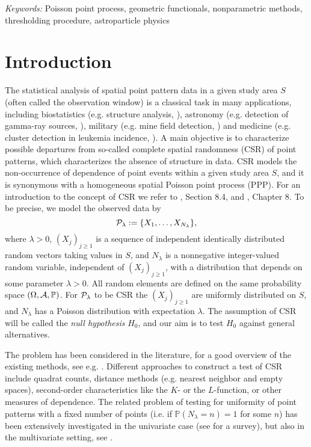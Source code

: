\documentclass[12pt]{article}
\def\P{\mathbb{P}}
\begin{document}
\noindent%
{\it Keywords:} Poisson point process, geometric functionals, nonparametric methods, thresholding procedure, astroparticle physics
\vfill

\newpage
{} %
\section{Introduction}
The statistical analysis of spatial point pattern data in a given study area $S$ (often called the observation window) is a classical task in many applications, including biostatistics
(e.g. structure analysis, \cite{25}), astronomy (e.g. detection of gamma-ray sources, \cite{24}), military (e.g. mine field detection, \cite{22}) and medicine (e.g. cluster detection in leukemia incidence, \cite{23}). A main objective is to characterize possible departures from so-called complete spatial randomness (CSR) of point patterns, which characterizes the absence of structure in data. CSR models the non-occurrence of dependence of point events within a given study area $S$, and it is synonymous with a homogeneous spatial Poisson point process (PPP). For an introduction to the concept of CSR we refer to \cite{15}, Section 8.4, and \cite{17}, Chapter 8. To be precise, we model the observed data by
\begin{equation*}
{\cal P}_\lambda := \{X_1,\ldots,X_{N_\lambda}\},
\end{equation*}
where $\lambda>0$, $(X_j)_{j\ge1}$ is a sequence of independent identically distributed random vectors taking values in $S$, and $N_\lambda$ is a nonnegative integer-valued random variable, independent of $(X_j)_{j \ge 1}$, with a distribution  that depends on some parameter $\lambda>0$. All random elements are defined on the same probability space $(\Omega,{\cal A},\P)$.
For ${\cal P}_\lambda$ to be CSR the $(X_j)_{j\ge1}$ are uniformly distributed on $S$, and $N_\lambda$ has a Poisson distribution with expectation $\lambda$.
The assumption of CSR will be called the {\em null hypothesis} $H_0$, and our aim is to test $H_0$ against general alternatives.

The problem has been considered in the literature, for a good overview of the existing methods, see e.g. \cite{15,16,01}.
Different approaches to construct a test of CSR include quadrat counts, distance methods (e.g. nearest neighbor and empty spaces), second-order characteristics like the $K$- or the $L$-function, or other measures of dependence. The related problem of testing for uniformity of point patterns with a fixed number of points (i.e. if $\P(N_\lambda=n)=1$ for some $n$)
has been extensively investigated in the univariate case (see \cite{12} for a survey), but also in the multivariate setting, see \cite{06,05,26,02,04,45}.
\end{document}
